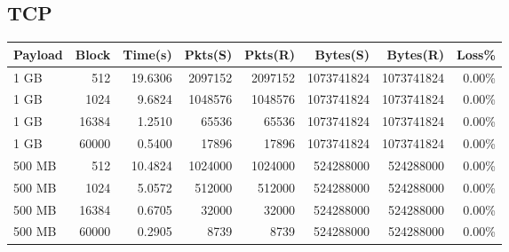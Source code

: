 \documentclass{article}
\begin{document}
\subsection{ TCP}
\begin{small}
    \begin{longtable}{l r r r r r r r}
        \toprule
        \textbf{Payload} & \textbf{Block} & \textbf{Time(s)} & \textbf{Pkts(S)} & \textbf{Pkts(R)} & \textbf{Bytes(S)} & \textbf{Bytes(R)} & \textbf{Loss\%} \\
        \midrule
        1 GB             & 512            & 19.6306          & 2097152          & 2097152          & 1073741824        & 1073741824        & 0.00\%          \\
        1 GB             & 1024           & 9.6824           & 1048576          & 1048576          & 1073741824        & 1073741824        & 0.00\%          \\
        1 GB             & 16384          & 1.2510           & 65536            & 65536            & 1073741824        & 1073741824        & 0.00\%          \\
        1 GB             & 60000          & 0.5400           & 17896            & 17896            & 1073741824        & 1073741824        & 0.00\%          \\
        500 MB           & 512            & 10.4824          & 1024000          & 1024000          & 524288000         & 524288000         & 0.00\%          \\
        500 MB           & 1024           & 5.0572           & 512000           & 512000           & 524288000         & 524288000         & 0.00\%          \\
        500 MB           & 16384          & 0.6705           & 32000            & 32000            & 524288000         & 524288000         & 0.00\%          \\
        500 MB           & 60000          & 0.2905           & 8739             & 8739             & 524288000         & 524288000         & 0.00\%          \\
        \bottomrule
    \end{longtable}
\end{small}
\end{document}
